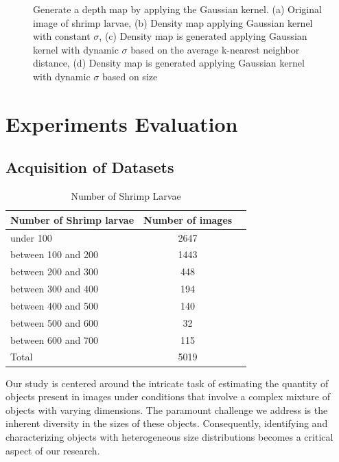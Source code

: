 \documentclass[journal]{IEEEtran}
\begin{document}
\begin{figure}[h]
        \caption{Generate a depth map by applying the Gaussian kernel. (a) Original image of shrimp larvae, (b) Density map applying Gaussian kernel with constant $\sigma$, (c) Density map is generated applying Gaussian kernel with dynamic $\sigma$ based on the average k-nearest neighbor distance, (d) Density map is generated applying Gaussian kernel with dynamic $\sigma$ based on size}
        \label{fig:1}
\end{figure}
\section{Experiments Evaluation}
\subsection{Acquisition of Datasets}

\begin{table}[ht]
        \centering
        \caption{Number of Shrimp Larvae}
        \begin{tabular}{l|cc}
            \toprule
            Number of Shrimp larvae & Number of images\\
            \midrule
            under 100                   & 2647    \\
            between 100 and 200         & 1443    \\
            between 200 and 300         & 448    \\
            between 300 and 400         & 194    \\
            between 400 and 500         & 140    \\
            between 500 and 600         & 32    \\
            between 600 and 700         & 115    \\
            Total                       & 5019    \\

            \bottomrule
        \end{tabular}
    \end{table}

Our study is centered around the intricate task of estimating the quantity of objects present in images under conditions that involve a complex mixture of objects with varying dimensions. The paramount challenge we address is the inherent diversity in the sizes of these objects. Consequently, identifying and characterizing objects with heterogeneous size distributions becomes a critical aspect of our research.
\end{document}
